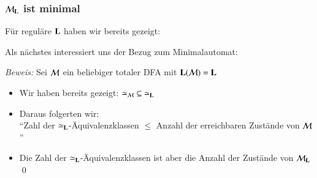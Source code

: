 \documentclass[aspectratio=1610,onlymath]{beamer}
\begin{document}
\begin{frame}[t]\frametitle{$\mathcal{M}_{\textbf{\textcolor{black}{L}}}$ ist minimal}

Für reguläre $\textbf{\textcolor{black}{L}}$ haben wir bereits gezeigt:
%
\medskip

Als nächstes interessiert uns der Bezug zum Minimalautomat\pause:

\pause

\emph{Beweis:} Sei $\mathcal{M}$ ein beliebiger totaler DFA mit $\textbf{\textcolor{black}{L}}(\mathcal{M})=\textbf{\textcolor{black}{L}}$
\begin{itemize}
\item Wir haben bereits gezeigt: ${\simeq_{\mathcal{M}}}\subseteq{\simeq_{\textbf{\textcolor{black}{L}}}}$
\item Daraus folgerten wir:\\ "`Zahl der $\simeq_{\textbf{\textcolor{black}{L}}}$-Äquivalenzklassen $\leq$ Anzahl der erreichbaren Zustände von $\mathcal{M}$"'
\item Die Zahl der $\simeq_{\textbf{\textcolor{black}{L}}}$-Äquivalenzklassen ist aber die Anzahl der Zustände von $\mathcal{M}_{\textbf{\textcolor{black}{L}}}$\qed
\end{itemize}

\end{frame}
\end{document}
